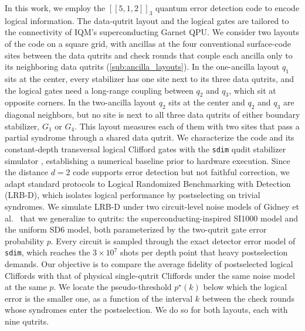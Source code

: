 In this work, we employ the $[[5,1,2]]_3$ quantum error detection code to encode logical information. The data-qutrit layout and the logical gates are tailored to the connectivity of IQM’s superconducting Garnet QPU.
We consider two layouts of the code on a square grid, with ancillas at the four conventional surface-code sites between the data qutrits and check rounds that couple each ancilla only to its neighboring data qutrits (\autoref{sub:ancilla_layouts}). In the one-ancilla layout $q_1$ sits at the center, every stabilizer has one site next to its three data qutrits, and the logical gates need a long-range coupling between $q_2$ and $q_3$, which sit at opposite corners. In the two-ancilla layout $q_2$ sits at the center and $q_2$ and $q_3$ are diagonal neighbors, but no site is next to all three data qutrits of either boundary stabilizer, $G_1$ or $G_4$. This layout measures each of them with two sites that pass a partial syndrome through a shared data qutrit. We characterize the code and its constant-depth transversal logical Clifford gates with the \texttt{sdim} qudit stabilizer simulator \cite{sdim}, establishing a numerical baseline prior to hardware execution. Since the distance $d=2$ code supports error detection but not faithful correction, we adapt standard protocols to Logical Randomized Benchmarking with Detection (LRB-D), which isolates logical performance by postselecting on trivial syndromes. We simulate LRB-D under two circuit-level noise models of Gidney et al.~\cite{GidneyHoneycomb2021} that we generalize to qutrits: the superconducting-inspired SI1000 model and the uniform SD6 model, both parameterized by the two-qutrit gate error probability $p$. Every circuit is sampled through the exact detector error model of \texttt{sdim}, which reaches the $3\times 10^{7}$ shots per depth point that heavy postselection demands. Our objective is to compare the average fidelity of postselected logical Cliffords with that of physical single-qutrit Cliffords under the same noise model at the same $p$. We locate the pseudo-threshold $p^\star(k)$ below which the logical error is the smaller one, as a function of the interval $k$ between the check rounds whose syndromes enter the postselection. We do so for both layouts, each with nine qutrits.

